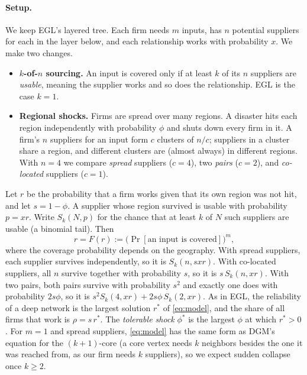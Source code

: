 \documentclass[10pt]{article}
\begin{document}
\paragraph{Setup.} We keep EGL's layered tree. Each firm needs $m$ inputs, has $n$ potential suppliers for each in the layer below, and each relationship works with probability $x$. We make two changes.
\begin{itemize}
\item \textbf{$k$-of-$n$ sourcing.} An input is covered only if at least $k$ of its $n$ suppliers are \emph{usable}, meaning the supplier works and so does the relationship. EGL is the case $k=1$.
\item \textbf{Regional shocks.} Firms are spread over many regions. A disaster hits each region independently with probability $\phi$ and shuts down every firm in it. A firm's $n$ suppliers for an input form $c$ clusters of $n/c$; suppliers in a cluster share a region, and different clusters are (almost always) in different regions. With $n=4$ we compare \emph{spread} suppliers ($c=4$), two \emph{pairs} ($c=2$), and \emph{co-located} suppliers ($c=1$).
\end{itemize}
Let $r$ be the probability that a firm works given that its own region was not hit, and let $s=1-\phi$. A supplier whose region survived is usable with probability $p=xr$. Write $S_k(N,p)$ for the chance that at least $k$ of $N$ such suppliers are usable (a binomial tail). Then
\begin{equation}
r = F(r) := \bigl(\Pr[\text{an input is covered}]\bigr)^m ,
\label{eq:model}
\end{equation}
where the coverage probability depends on the geography. With spread suppliers, each supplier survives independently, so it is $S_k(n,sxr)$. With co-located suppliers, all $n$ survive together with probability $s$, so it is $s\,S_k(n,xr)$. With two pairs, both pairs survive with probability $s^2$ and exactly one does with probability $2s\phi$, so it is $s^2S_k(4,xr)+2s\phi\,S_k(2,xr)$. As in EGL, the reliability of a deep network is the largest solution $r^*$ of \eqref{eq:model}, and the share of all firms that work is $\rho=s\,r^*$. The \emph{tolerable shock} $\phi^*$ is the largest $\phi$ at which $r^*>0$. For $m=1$ and spread suppliers, \eqref{eq:model} has the same form as DGM's equation for the $(k+1)$-core (a core vertex needs $k$ neighbors besides the one it was reached from, as our firm needs $k$ suppliers), so we expect sudden collapse once $k\ge2$.
\end{document}
